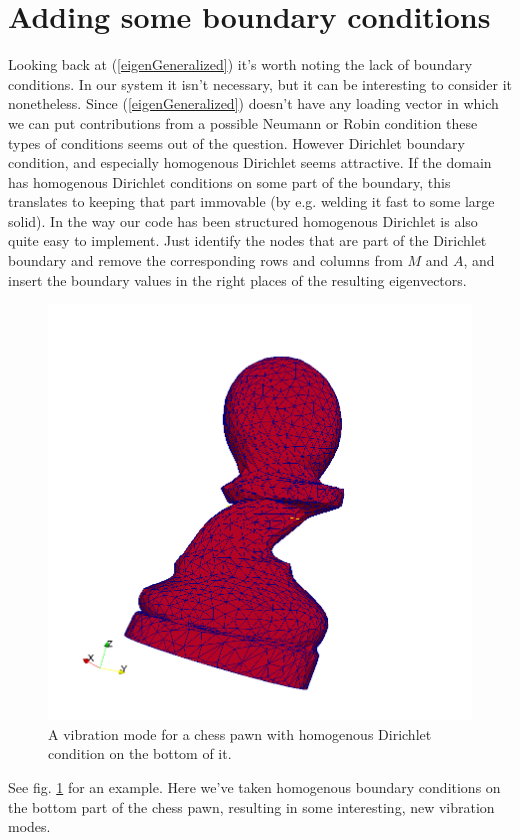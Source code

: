 \documentclass[paper=a4, fontsize=11pt]{scrartcl} %
\begin{document}
\section*{Adding some boundary conditions}
Looking back at (\ref{eigenGeneralized}) it's worth noting the lack of boundary conditions. In our system it isn't necessary, but it can be interesting to consider it nonetheless. Since (\ref{eigenGeneralized}) doesn't have any loading vector in which we can put contributions from a possible Neumann or Robin condition these types of conditions seems out of the question. However Dirichlet boundary condition, and especially homogenous Dirichlet seems attractive. If the domain has homogenous Dirichlet conditions on some part of the boundary, this translates to keeping that part immovable (by e.g. welding it fast to some large solid). In the way our code has been structured homogenous Dirichlet is also quite easy to implement. Just identify the nodes that are part of the Dirichlet boundary and remove the corresponding rows and columns from $M$ and $A$, and insert the boundary values in the right places of the resulting eigenvectors.
\begin{figure}
\centering
\includegraphics[scale=0.3]{HmgPawn.png}
\caption{A vibration mode for a chess pawn with homogenous Dirichlet condition on the bottom of it.}
\label{fig:HmgPawn}
\end{figure}
See fig. \ref{fig:HmgPawn} for an example. Here we've taken homogenous boundary conditions on the bottom part of the chess pawn, resulting in some interesting, new vibration modes.
\end{document}
